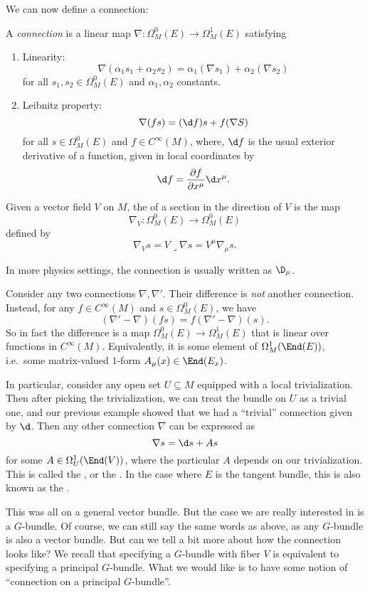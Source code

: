 \documentclass[a4paper]{article}
\begin{document}
We can now define a connection:
\begin{defi}[Connection]
  A \emph{connection} \index{$\nabla$} is a linear map $\nabla: \Omega_M^0(E) \to \Omega_M^1(E)$ satisfying
  \begin{enumerate}
    \item Linearity:
      \[
        \nabla(\alpha_1 s_1 + \alpha_2 s_2) = \alpha_1 (\nabla s_1) + \alpha_2( \nabla s_2)
      \]
      for all $s_1, s_2 \in \Omega_M^0(E)$ and $\alpha_1, \alpha_2$ constants.
    \item Leibnitz property:
      \[
        \nabla (fs) = (\d f) s + f (\nabla S)
      \]
      for all $s \in \Omega^0_M(E)$ and $f \in C^\infty(M)$, where, $\d f$ is the usual exterior derivative of a function, given in local coordinates by
      \[
        \d f = \frac{\partial f}{\partial x^\mu} \d x^\mu.
      \]
  \end{enumerate}
  Given a vector field $V$ on $M$, the  of a section in the direction of $V$ is the map
  \[
    \nabla_V: \Omega^0_M(E) \to \Omega^0_M(E)
  \]
  defined by
  \[
    \nabla_V s = V \lrcorner \nabla s = V^\mu \nabla_\mu s.
  \]
\end{defi}
In more physics settings, the connection is usually written as $\D_\mu$.

Consider any two connections $\nabla, \nabla'$. Their difference is \emph{not} another connection. Instead, for any $f \in C^\infty(M)$ and $s \in \Omega^0_M(E)$, we have
\[
  (\nabla' - \nabla)(fs) = f (\nabla' - \nabla)(s).
\]
So in fact the difference is a map $\Omega^0_M(E) \to \Omega_M^1(E)$ that is linear over functions in $C^\infty(M)$. Equivalently, it is some element of $\Omega^1_M(\End(E))$, i.e.\ some matrix-valued $1$-form $A_\mu (x) \in \End(E_x)$.

In particular, consider any open set $U \subseteq M$ equipped with a local trivialization. Then after picking the trivialization, we can treat the bundle on $U$ as a trivial one, and our previous example showed that we had a ``trivial'' connection given by $\d$. Then any other connection $\nabla$ can be expressed as
\[
  \nabla s = \d s + A s
\]
for some $A \in \Omega^1_U(\End(V))$, where the particular $A$ depends on our trivialization. This is called the , or the . In the case where $E$ is the tangent bundle, this is also known as the .

This was all on a general vector bundle. But the case we are really interested in is a $G$-bundle. Of course, we can still say the same words as above, as any $G$-bundle is also a vector bundle. But can we tell a bit more about how the connection looks like? We recall that specifying a $G$-bundle with fiber $V$ is equivalent to specifying a principal $G$-bundle. What we would like is to have some notion of ``connection on a principal $G$-bundle''.
\end{document}
